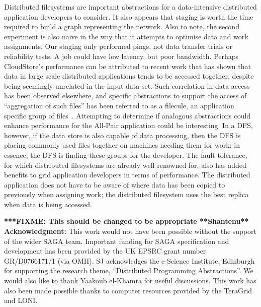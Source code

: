 \documentclass{rspublic}
\newcommand{\fixme}[1]{ { \bf{ ***FIXME: #1 }} }
\newcommand{\fixme}[1]{}
\begin{document}
Distributed filesystems are important abstractions for a data-intensive
distributed application developers to consider. It also appears that
staging is worth the time required to build a graph representing the
network. Also to note, the second experiment is also naive in the way
that it attempts to optimise data and work assignments. Our staging only
performed pings, not data transfer trials or reliability tests. A job
could have low latency, but poor bandwidth. Perhaps CloudStore's
performance can be attributed to recent work that has shown that data in
large scale distributed applications tends to be accessed together,
despite being seemingly unrelated in the input data-set. Such
correlation in data-access has been observed elsewhere, and specific
abstractions to support the access of ``aggregation of such files'' has
been referred to as a filecule, an application specific group of
files~\citep{filecule}. Attempting to determine if analogous abstractions
could enhance performance for the All-Pair application could be
interesting.  In a DFS, however, if the data store is also capable of
data processing, then the DFS is placing commonly used files together on
machines needing them for work; in essence, the DFS is finding these
groups for the developer. The fault tolerance, for which distributed
filesystems are already well renowned for, also has added benefits to
grid application developers in terms of performance. The distributed
application does not have to be aware of where data has been copied to
previously when assigning work; the distributed filesystem uses the best
replica when data is being accessed.

\fixme{This should be changed to be appropriate \bf{**Shantenu**}}
{\bf Acknowledgment:} This work would not have been possible without the support of 
     the wider SAGA team. Important funding for SAGA
     specification and development has been provided by the UK EPSRC
     grant number GR/D0766171/1 (via OMII).  SJ acknowledges the
     e-Science Institute, Edinburgh for supporting the research theme,
     ``Distributed Programming Abstractions''.  We would also like to
     thank Yaakoub el-Khamra for useful discussions. This work has also
     been made possible thanks to computer resources provided by the
     TeraGrid and LONI.

%
 

\end{document}
